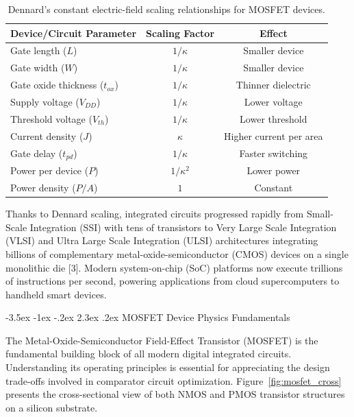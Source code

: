 \documentclass[12pt,a4paper,oneside]{report}
\makeatletter
\renewcommand\section{\@startsection {section}{1}{\z@}%
                                   {-3.5ex \@plus -1ex \@minus -.2ex}%
                                   {2.3ex \@plus.2ex}%
                                   {\normalfont\normalsize\bfseries}}
\makeatother
\begin{document}
\begin{table}[H]
\centering
\caption{Dennard's constant electric-field scaling relationships for MOSFET devices.}
\label{tab:dennard_scaling}
\vspace{0.2cm}
\begin{tabular}{|l|c|c|}
\hline
\textbf{Device/Circuit Parameter} & \textbf{Scaling Factor} & \textbf{Effect} \\
\hline
Gate length ($L$) & $1/\kappa$ & Smaller device \\
\hline
Gate width ($W$) & $1/\kappa$ & Smaller device \\
\hline
Gate oxide thickness ($t_{ox}$) & $1/\kappa$ & Thinner dielectric \\
\hline
Supply voltage ($V_{DD}$) & $1/\kappa$ & Lower voltage \\
\hline
Threshold voltage ($V_{th}$) & $1/\kappa$ & Lower threshold \\
\hline
Current density ($J$) & $\kappa$ & Higher current per area \\
\hline
Gate delay ($t_{pd}$) & $1/\kappa$ & Faster switching \\
\hline
Power per device ($P$) & $1/\kappa^2$ & Lower power \\
\hline
Power density ($P/A$) & $1$ & Constant \\
\hline
\end{tabular}
\end{table}

Thanks to Dennard scaling, integrated circuits progressed rapidly from Small-Scale Integration (SSI) with tens of transistors to Very Large Scale Integration (VLSI) and Ultra Large Scale Integration (ULSI) architectures integrating billions of complementary metal-oxide-semiconductor (CMOS) devices on a single monolithic die [3]. Modern system-on-chip (SoC) platforms now execute trillions of instructions per second, powering applications from cloud supercomputers to handheld smart devices.

\section{MOSFET Device Physics Fundamentals}

The Metal-Oxide-Semiconductor Field-Effect Transistor (MOSFET) is the fundamental building block of all modern digital integrated circuits. Understanding its operating principles is essential for appreciating the design trade-offs involved in comparator circuit optimization. Figure~\ref{fig:mosfet_cross} presents the cross-sectional view of both NMOS and PMOS transistor structures on a silicon substrate.
\end{document}
